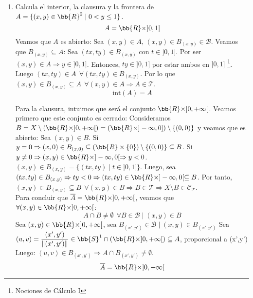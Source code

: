 \documentclass[12pt]{article}
\newcounter{ejercicio}[section] %
\newcounter{ejercicio}
\begin{document}
\begin{ejercicio}[4.5 puntos]
\begin{enumerate}[label=(\alph*)]
            \item Calcula el interior, la clausura y la frontera de $A = \{ (x,y) \in \bb{R}^2 \mid 0 < y \leq 1\}$.\\

                \noindent
                $$A = \bb{R} \times ]0,1]$$
                Veamos que $A$ es abierto:\newline
                Sea $(x,y) \in A$, $(x,y) \in B_{(x,y)} \in \mathcal{B}$. Veamos que $B_{(x,y)} \subseteq A$:\newline
                Sea $(tx, ty) \in B_{(x,y)}$ con $t \in ]0,1]$. Por ser $(x,y) \in A \Rightarrow y \in ]0,1]$.\newline
                Entonces, $ty \in ]0,1]$ por estar ambos en $]0,1]$ \footnote{Nociones de Cálculo I}.\newline
                Luego $(tx, ty) \in A~~\forall (tx, ty) \in B_{(x,y)}$.\newline
                Por lo que $(x,y) \in B_{(x,y)} \subseteq A~~\forall (x,y) \in A \Rightarrow A \in \mathcal{T}$.
                $$\mathrm{int}(A) = A$$

                \noindent
                Para la clausura, intuimos que será el conjunto $\bb{R} \times ]0, +\infty[$. Veamos primero que este conjunto es cerrado:\newline
                Consideramos $B = X\setminus (\bb{R} \times ]0,+\infty[) = (\bb{R} \times ]-\infty, 0]) \setminus \{(0,0)\}$ y veamos que es abierto:\newline
                Sea $(x,y) \in B$. Si $y = 0 \Rightarrow (x,0) \in B_{(x,0)} \subseteq (\bb{R} \times \{0\})\setminus \{(0,0)\} \subseteq B$.\newline
                Si $y \neq 0 \Rightarrow (x,y) \in \bb{R} \times ]-\infty, 0[ \Rightarrow y < 0$. $(x,y) \in B_{(x,y)} = \{(tx,ty) \mid t \in ]0,1]\}$.\newline
                Luego, sea $(tx, ty) \in B_{(x,y)} \Rightarrow ty < 0 \Rightarrow (tx, ty) \in \bb{R}\times ]-\infty, 0[ \subseteq B$.\newline
                Por tanto, $(x,y) \in B_{(x,y)} \subseteq B~~\forall (x,y) \in B \Rightarrow B \in \mathcal{T} \Rightarrow X\setminus B \in \mathcal{C_T}$.\\

                \noindent
                Para concluir que $\overline{A} = \bb{R} \times ]0, +\infty[$, veamos que $\forall (x,y) \in \bb{R} \times ]0, +\infty[$:
                $$A \cap B \neq \emptyset ~~\forall B \in \mathcal{B} \mid (x,y) \in B$$
                Sea $(x,y) \in \bb{R} \times ]0, +\infty[$, sea $B_{(x', y')} \in \mathcal{B} \mid (x,y) \in B_{(x', y')}$\newline
                Sea $(u,v) = \dfrac{(x',y')}{\|(x',y')\|} \in \bb{S}^1 \cap (\bb{R} \times ]0, +\infty[) \subseteq A$, proporcional a (x',y')\newline
                Luego: $(u,v) \in B_{(x', y')} \Rightarrow A \cap B_{(x', y')} \neq \emptyset$.
                $$\overline{A} = \bb{R} \times ]0, +\infty[$$


\end{enumerate}
\end{ejercicio}
\end{document}

